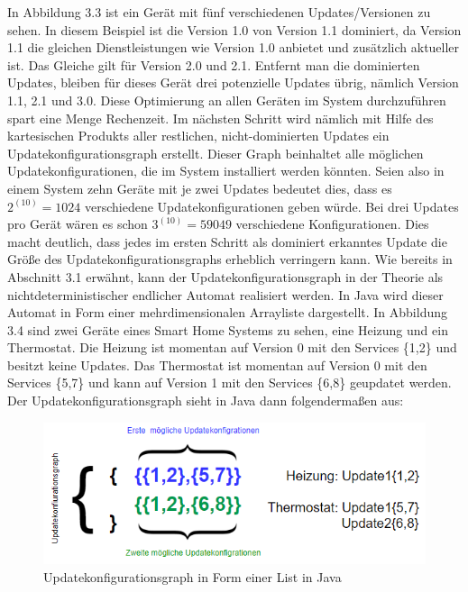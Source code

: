 \FloatBarrier
In Abbildung 3.3 ist ein Gerät mit fünf verschiedenen Updates/Versionen zu sehen. In diesem Beispiel ist die Version 1.0 von Version 1.1 dominiert,
da Version 1.1 die gleichen Dienstleistungen wie Version 1.0 anbietet und zusätzlich aktueller ist. Das Gleiche gilt für Version 2.0 und 2.1.
Entfernt man die dominierten Updates, bleiben für dieses Gerät drei potenzielle Updates übrig, nämlich Version 1.1, 2.1 und 3.0.
Diese Optimierung an allen Geräten im System durchzuführen spart eine Menge Rechenzeit.
Im nächsten Schritt wird nämlich mit Hilfe des kartesischen Produkts aller restlichen, nicht-dominierten Updates ein Updatekonfigurationsgraph
erstellt. Dieser Graph beinhaltet alle möglichen Updatekonfigurationen, die im System installiert werden könnten. Seien also in einem System zehn
Geräte mit je zwei Updates bedeutet dies, dass es \( 2^{(10)} = 1024\) verschiedene Updatekonfigurationen geben würde. Bei drei Updates pro Gerät
wären es schon \( 3^{(10)} = 59049\) verschiedene Konfigurationen. Dies macht deutlich, dass jedes im ersten Schritt als dominiert erkanntes
Update die Größe des Updatekonfigurationsgraphs erheblich verringern kann. Wie bereits in Abschnitt 3.1 erwähnt, kann der Updatekonfigurationsgraph in der Theorie als
nichtdeterministischer endlicher Automat realisiert werden. In Java wird dieser Automat in Form einer mehrdimensionalen Arrayliste dargestellt.
In Abbildung 3.4 sind zwei Geräte eines Smart Home Systems zu sehen, eine Heizung und ein Thermostat. 
Die Heizung ist momentan auf Version 0 mit den Services  \{1,2\} und besitzt keine Updates.
Das Thermostat ist momentan auf Version 0 mit den Services  \{5,7\} und kann auf Version 1 mit den Services \{6,8\} geupdatet werden.
Der Updatekonfigurationsgraph sieht in Java dann folgendermaßen aus:
\begin{figure}[!h]
\begin{center}
\includegraphics{"images/UCG Java"}
\caption{Updatekonfigurationsgraph in Form einer List in Java}
\label{fig:Prob1:MEA}
\end{center}
\end{figure}
